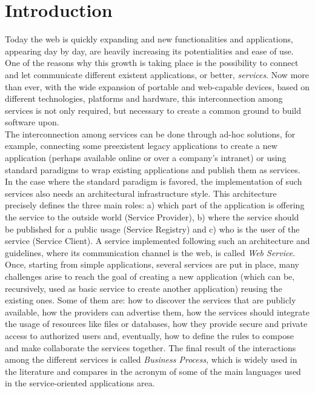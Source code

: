 \section{Introduction}

Today the web is quickly expanding and new functionalities and applications, appearing day by day, are heavily increasing its potentialities and ease of use. One of the reasons why this growth is taking place is the possibility to connect and let communicate different existent applications, or better, \textit{services}. Now more than ever, with the wide expansion of portable and web-capable devices, based on different technologies, platforms and hardware, this interconnection among services is not only required, but necessary to create a common ground to build software upon.\\

The interconnection among services can be done through ad-hoc solutions, for example, connecting some preexistent legacy applications to create a new application (perhaps available online or over a company's intranet) or using standard paradigms to wrap existing applications and publish them as services. %
In the case where the standard paradigm is favored, the implementation of such services also needs an architectural infrastructure style. This architecture precisely defines the three main roles: a) which part of the application is offering the service to the outside world (Service Provider), b) where the service should be published for a public usage (Service Registry) and c) who is the user of the service (Service Client). %
A service implemented following such an architecture and guidelines, where its communication channel is the web, is called \textit{Web Service}.\\ %

Once, starting from simple applications, several services are put in place, many challenges arise to reach the goal of creating a new application (which can be, recursively, used as basic service to create another application) reusing the existing ones. Some of them are: how to discover the services that are publicly available, how the providers can advertise them, how the services should integrate the usage of resources like files or databases, how they provide secure and private access to authorized users and, eventually, how to define the rules to compose and make collaborate the services together. 
The final result of the interactions among the different services is called \textit{Business Process}, which is widely used in the literature and compares in the acronym of some of the main languages used in the service-oriented applications area.\\

